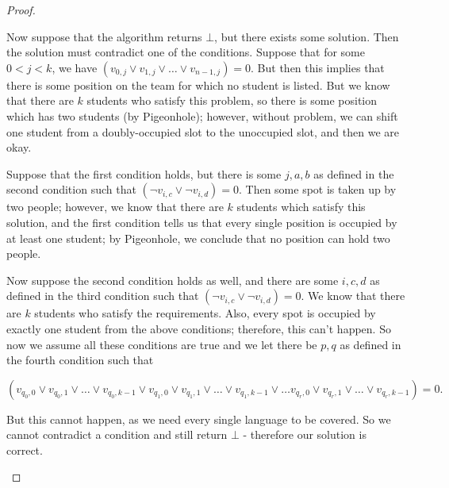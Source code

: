 \documentclass[11pt]{article}
\begin{document}
\begin{enumerate}
\begin{proof}
\begin{enumerate}
Now suppose that the algorithm returns $\bot$, but there exists some solution. Then the solution must contradict one of the conditions. Suppose that for some $0 < j < k$, we have $(v_{0, j} \vee v_{1, j} \vee \dots \vee v_{n  - 1, j}) = 0$. But then this implies that there is some position on the team for which no student is listed. But we know that there are $k$ students who satisfy this problem, so there is some position which has two students (by Pigeonhole); however, without problem, we can shift one student from a doubly-occupied slot to the unoccupied slot, and then we are okay.

Suppose that the first condition holds, but there is some $j, a, b$ as defined in the second condition such that $(\neg v_{i, c} \vee \neg v_{i, d}) = 0$. Then some spot is taken up by two people; however, we know that there are $k$ students which satisfy this solution, and the first condition tells us that every single position is occupied by at least one student; by Pigeonhole, we conclude that no position can hold two people.

Now suppose the second condition holds as well, and there are some $i, c, d$ as defined in the third condition such that $(\neg v_{i, c} \vee \neg v_{i, d}) = 0$. We know that there are $k$ students who satisfy the requirements. Also, every spot is occupied by exactly one student from the above conditions; therefore, this can't happen. So now we assume all these conditions are true and we let there be $p, q$ as defined in the fourth condition such that  

$$
(v_{q_0, 0} \vee v_{q_0, 1} \vee \dots \vee v_{q_0, k - 1} \vee v_{q_1, 0} \vee v_{q_1, 1} \vee \dots \vee v_{q_1, k - 1} \vee \dots v_{q_r, 0} \vee v_{q_r, 1}\vee \dots \vee v_{q_r, k - 1}) = 0.
$$

But this cannot happen, as we need every single language to be covered. So we cannot contradict a condition and still return $\bot$ - therefore our solution is correct.


\end{enumerate}
\end{proof}
 
\end{enumerate}
\end{document}
